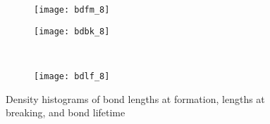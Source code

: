 \documentclass{article}
\begin{document}
\begin{figure}[h]
  \centering
  \begin{subfigure}{0.49\textwidth}
    \texttt{[image: bdfm\_8]}
  \end{subfigure}
  \hfill
  \begin{subfigure}{0.49\textwidth}
    \texttt{[image: bdbk\_8]}
  \end{subfigure}
  \\
  \begin{subfigure}{0.49\textwidth}
    \texttt{[image: bdlf\_8]}
  \end{subfigure}
  \caption{Density histograms of bond lengths at formation, lengths
    at breaking, and bond lifetime}
  \label{fig:dwell-corr}
\end{figure}

% 
% 
\end{document}
